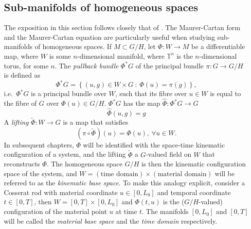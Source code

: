 \subsection{Sub-manifolds of homogeneous spaces} \label{sec:Sub-manifolds of homogeneous spaces}

The exposition in this section follows closely that of \citep{clellandFrenetCartanMethod2017}. The Maurer-Cartan form and the Maurer-Cartan equation are particularly useful when studying sub-manifolds of homogeneous spaces. If $M \subset G/H$, let $\Phi : W \to M$ be a differentiable map, where $W$ is some $n$-dimensional manifold, where $\mathbb{T}^n$ is the $n$-dimensional torus, for some $n$. The \textit{pullback bundle} $\Phi^*G$ of the principal bundle $\pi : G \to G/H$ is defined as
\begin{equation} \label{eq:pullback bundle}
\Phi^*G = \left\{ (u,g) \in W \times G\ :\ \Phi(u) = \pi(g) \right\},
\end{equation}
i.e.~$\Phi^* G$ is a principal bundle over $W$, such that its fibre over $u \in W$ is equal to the fibre of $G$ over $\Phi(u) \in G/H$. $\Phi^* G$ has the map $\hat{\Phi} : \Phi^*G \to G$
\begin{equation}
\hat{\Phi}(u, g) = g
\end{equation}
A \textit{lifting} $\tilde{\Phi} : W \to G$ is a map that satisfies
\begin{equation}
(\pi \circ \tilde{\Phi})(u) = \Phi(u),\ \forall u \in W.
\end{equation}
In subsequent chapters, $\Phi$ will be identified with the space-time kinematic configuration of a system, and the lifting $\tilde{\Phi}$ a $G$-valued field on $W$ that reconstructs $\Phi$. The homogeneous space $G/H$ is then the kinematic configuration space of the system, and $W = (\text{time domain}) \times (\text{material domain})$ will be referred to as the \textit{kinematic base space}. To make this analogy explicit, consider a Cosserat rod with material coordinate $u \in [0, L_0]$ and temporal coordinate $t \in [0, T]$, then $W = [0, T] \times [0, L_0]$ and $\Phi(t,u)$ is the ($G/H$-valued) configuration of the material point $u$ at time $t$. The manifolds $[0, L_0]$ and $[0, T]$ will be called the \textit{material base space} and the \textit{time domain} respectively.


